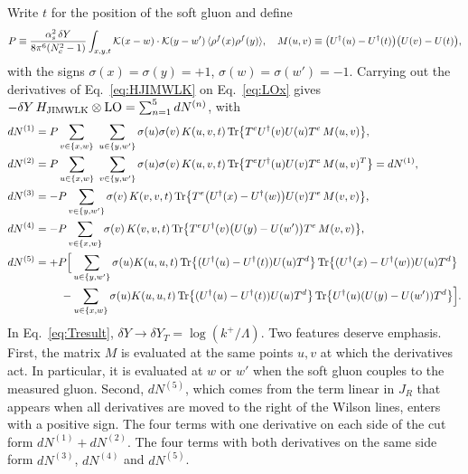 Write $t$ for the position of the soft gluon and define
\begin{equation}
P\equiv\frac{\alpha_s^2\,\delta Y}{8\pi^6(N_c^2-1)}\int_{x,y,t}\mathcal{K}(x-w)\cdot\mathcal{K}(y-w')\,\langle\rho^f(x)\rho^f(y)\rangle,\quad M(u,v)\equiv\big(U^{\dagger}(u)-U^{\dagger}(t)\big)\big(U(v)-U(t)\big),
\end{equation}
with the signs $\sigma(x)=\sigma(y)=+1$, $\sigma(w)=\sigma(w')=-1$. Carrying out the derivatives of Eq.~\eqref{eq:HJIMWLK} on Eq.~\eqref{eq:LOx} gives $-\delta Y\,H_{\rm JIMWLK}\otimes{\rm LO}=\sum_{n=1}^5dN^{(n)}$, with
\begin{align}
dN^{(1)}&=P\sum_{v\in\{x,w\}}\ \sum_{u\in\{y,w'\}}\sigma(u)\sigma(v)\,K(u,v,t)\,\Tr\big\{T^e\Ud(v)U(u)T^e\,M(u,v)\big\},\\
dN^{(2)}&=P\sum_{u\in\{x,w\}}\ \sum_{v\in\{y,w'\}}\sigma(u)\sigma(v)\,K(u,v,t)\,\Tr\big\{T^e\Ud(u)U(v)T^e\,M(u,v)^T\big\}=dN^{(1)},\\
dN^{(3)}&=-P\sum_{v\in\{y,w'\}}\sigma(v)\,K(v,v,t)\,\Tr\big\{T^e\big(\Ud(x)-\Ud(w)\big)U(v)T^e\,M(v,v)\big\},\\
dN^{(4)}&=-P\sum_{v\in\{x,w\}}\sigma(v)\,K(v,v,t)\,\Tr\big\{T^e\Ud(v)\big(U(y)-U(w')\big)T^e\,M(v,v)\big\},\\
dN^{(5)}&=+P\Big[\sum_{u\in\{y,w'\}}\sigma(u)K(u,u,t)\,\Tr\big\{(\Ud(u)-\Ud(t))U(u)T^d\big\}\,\Tr\big\{(\Ud(x)-\Ud(w))U(u)T^d\big\}\notag\\
&\qquad\ -\sum_{u\in\{x,w\}}\sigma(u)K(u,u,t)\,\Tr\big\{(\Ud(u)-\Ud(t))U(u)T^d\big\}\,\Tr\big\{\Ud(u)(U(y)-U(w'))T^d\big\}\Big].
\end{align}
In Eq.~\eqref{eq:Tresult}, $\delta Y\to\delta Y_T=\log(k^+/\Lambda)$. Two features deserve emphasis. First, the matrix $M$ is evaluated at the same points $u,v$ at which the derivatives act. In particular, it is evaluated at $w$ or $w'$ when the soft gluon couples to the measured gluon. Second, $dN^{(5)}$, which comes from the term linear in $J_R$ that appears when all derivatives are moved to the right of the Wilson lines, enters with a positive sign. The four terms with one derivative on each side of the cut form $dN^{(1)}+dN^{(2)}$. The four terms with both derivatives on the same side form $dN^{(3)}$, $dN^{(4)}$ and $dN^{(5)}$.
